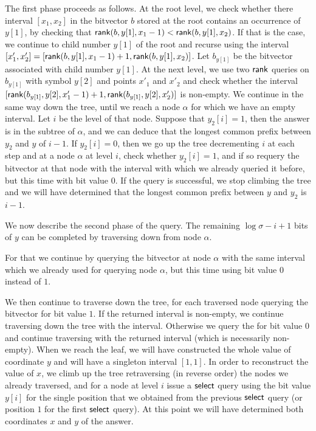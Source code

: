 \documentclass[11pt,runningheads]{llncs}
\def\rank{\mbox{\rm {\sf rank}}}
\def\select{\mbox{\rm {\sf select}}}
\begin{document}
The first phase proceeds as follows. At the root level, we 
check whether there interval $[x_1,x_2]$ in the bitvector $b$ stored at the root 
contains an occurrence of $y[1]$, 
by checking that $\rank(b,y[1],x_1-1)<\rank(b,y[1],x_2)$. 
If that is the case, we continue to child number $y[1]$ of the root 
and recurse using the interval $[x'_1,x'_2]=[\rank(b,y[1],x_1-1)+1,\rank(b,y[1],x_2)]$. 
Let $b_{y[1]}$ be the bitvector associated with child number $y[1]$. 
At the next level, we use two $\rank$ queries on $b_{y[1]}$ with symbol $y[2]$ and
points $x'_1$ and $x'_2$ and check whether 
the interval $[\rank(b_{y[1]},y[2],x'_1-1)+1,\rank(b_{y[1]},y[2],x'_2)]$ is non-empty. 
We continue in the same way down the tree, until we reach a node $\alpha$ for which we have an empty 
interval. Let $i$ be the level of that node. Suppose that $y_2[i]=1$, then the answer is in the subtree 
of $\alpha$, and we can deduce that the longest common prefix between $y_2$ and $y$
of $i-1$. If $y_2[i]=0$, then we go up the tree decrementing $i$ at each step and at a node $\alpha$ at level $i$, check whether $y_2[i]=1$, and if so requery the bitvector at that node with the interval with 
which we already queried it before, but this time with bit 
value $0$. If the query is successful, we stop climbing the tree and we will have determined that the longest 
common prefix between $y$ and $y_2$ is $i-1$. 

We now describe the second phase of the query. 
The remaining $\log\sigma-i+1$ bits of $y$ can be completed by traversing down from node $\alpha$. 

For that we  continue by querying the bitvector at node $\alpha$ with the same interval which we already used for querying node $\alpha$, but this time using bit value $0$ instead of $1$. 

We then continue to traverse down the tree, for each 
traversed node querying the bitvector for bit value $1$. If the returned interval is non-empty, we continue 
traversing down the tree with the interval. Otherwise we query the for bit value $0$ and continue traversing with 
the returned interval (which is necessarily non-empty). When we reach the leaf, we will have constructed 
the whole value of coordinate $y$ and will have a singleton interval $[1,1]$. In order to reconstruct the value of $x$, we climb up the tree retraversing (in reverse order) the nodes we already traversed, and for a node at level $i$ issue a $\select$ query using the bit value $y[i]$ for the single position that we obtained from the previous $\select$ query (or position $1$ for the first $\select$ query). 
At this point we will have determined both coordinates $x$ and $y$ of the answer. 
\end{document}
